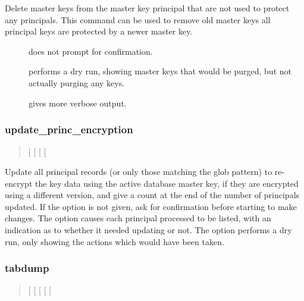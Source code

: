 \documentclass[letterpaper,10pt,english]{sphinxmanual}
\begin{document}
Delete master keys from the master key principal that are not used to
protect any principals.  This command can be used to remove old master
keys all principal keys are protected by a newer master key.
\begin{description}
\item[{}] \leavevmode
does not prompt for confirmation.

\item[{}] \leavevmode
performs a dry run, showing master keys that would be purged, but
not actually purging any keys.

\item[{}] \leavevmode
gives more verbose output.

\end{description}


\subsubsection{update\_princ\_encryption}
\label{\detokenize{admin/admin_commands/kdb5_util:update-princ-encryption}}\begin{quote}

 {[}\sphinxstylestrong{-f}{]} {[}\sphinxstylestrong{-n}{]} {[}\sphinxstylestrong{-v}{]}
{[}\sphinxstyleemphasis{princ-pattern}{]}
\end{quote}

Update all principal records (or only those matching the
 glob pattern) to re-encrypt the key data using the
active database master key, if they are encrypted using a different
version, and give a count at the end of the number of principals
updated.  If the  option is not given, ask for confirmation
before starting to make changes.  The  option causes each
principal processed to be listed, with an indication as to whether it
needed updating or not.  The  option performs a dry run, only
showing the actions which would have been taken.


\subsubsection{tabdump}
\label{\detokenize{admin/admin_commands/kdb5_util:tabdump}}\begin{quote}

 {[}\sphinxstylestrong{-H}{]} {[}\sphinxstylestrong{-c}{]} {[}\sphinxstylestrong{-e}{]} {[}\sphinxstylestrong{-n}{]} {[} \sphinxstyleemphasis{outfile}{]}
\end{quote}
\end{document}
